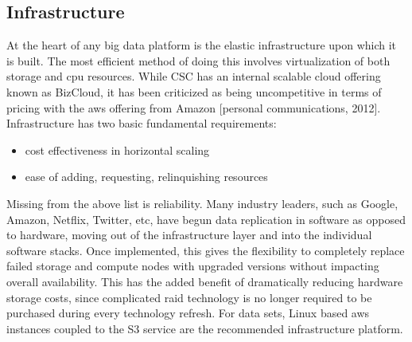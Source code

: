 \subsection{Infrastructure}
At the heart of any big data platform is the elastic infrastructure upon which it is built. The most efficient method of doing this involves virtualization  of both storage and cpu resources. While \textsc{CSC} has an internal scalable cloud offering known as BizCloud, it has been criticized as being uncompetitive in terms of pricing with the \gls{aws}  offering from Amazon [personal communications, 2012]. Infrastructure has two basic fundamental requirements:
\begin{itemize}
    \item cost effectiveness in horizontal scaling
    \item ease of adding, requesting, relinquishing resources
\end{itemize}
Missing from the above list is reliability. Many industry leaders, such as Google, Amazon, Netflix, Twitter, etc, have begun data replication in software as opposed to hardware, moving out of the infrastructure layer and into the individual software stacks. Once implemented, this gives the flexibility to completely replace failed storage and compute nodes with upgraded versions without impacting overall availability. This has the added benefit of dramatically reducing hardware storage costs, since complicated \gls{raid} technology is no longer required to be purchased during every technology refresh. For \climatedge data sets, Linux based \gls{aws} instances coupled to the S3 service are the recommended infrastructure platform.
